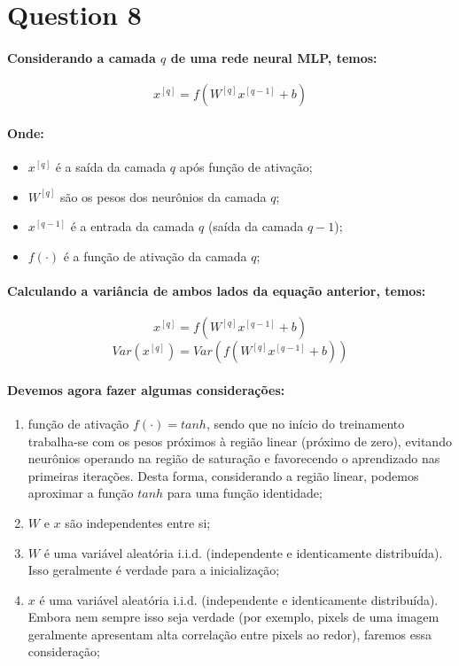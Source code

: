 \documentclass[a4paper]{article}    %
\begin{document}
\newpage
\section*{Question 8}

\paragraph{Considerando a camada $q$ de uma rede neural MLP, temos:}
\[x^{[q]} = f(W^{[q]} x^{[q-1]} + b)\]

\paragraph{Onde:}
\begin{itemize}
    \item $x^{[q]}$ é a saída da camada $q$ após função de ativação;
    \item $W^{[q]}$ são os pesos dos neurônios da camada $q$;
    \item $x^{[q-1]}$ é a entrada da camada $q$ (saída da camada $q-1$);
    \item $f(\cdot)$ é a função de ativação da camada $q$;
\end{itemize}

\paragraph{Calculando a variância de ambos lados da equação anterior, temos:}

\[x^{[q]} = f(W^{[q]} x^{[q-1]} + b)\]
\[Var(x^{[q]}) = Var(f(W^{[q]} x^{[q-1]} + b))\]

\paragraph{Devemos agora fazer algumas considerações:}
\begin{enumerate}[label=(\roman*)]
    \item função de ativação $f(\cdot) = tanh$, sendo que no início do treinamento trabalha-se com os pesos próximos à região linear (próximo de zero), evitando neurônios operando na região de saturação e favorecendo o aprendizado nas primeiras iterações. Desta forma, considerando a região linear, podemos aproximar a função $tanh$ para uma função identidade;
    \item $W$ e $x$ são independentes entre si;
    \item $W$ é uma variável aleatória i.i.d. (independente e identicamente distribuída). Isso geralmente é verdade para a inicialização;
    \item $x$ é uma variável aleatória i.i.d. (independente e identicamente distribuída). Embora nem sempre isso seja verdade (por exemplo, pixels de uma imagem geralmente apresentam alta correlação entre pixels ao redor), faremos essa consideração;
\end{enumerate}
\end{document}
